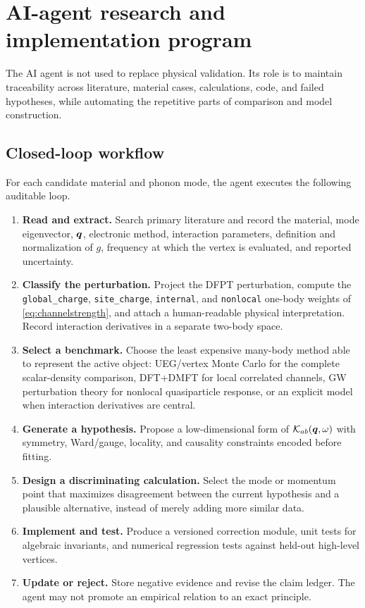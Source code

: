 \section{AI-agent research and implementation program}
\label{sec:program}

The AI agent is not used to replace physical validation.  Its role is to maintain
traceability across literature, material cases, calculations, code, and failed
hypotheses, while automating the repetitive parts of comparison and model
construction.

\subsection{Closed-loop workflow}

For each candidate material and phonon mode, the agent executes the following
auditable loop.

\begin{enumerate}
  \item \textbf{Read and extract.}  Search primary literature and record the
  material, mode eigenvector, $\bm{q}$, electronic method, interaction parameters,
  definition and normalization of $g$, frequency at which the vertex is evaluated,
  and reported uncertainty.
  \item \textbf{Classify the perturbation.}  Project the DFPT perturbation,
  compute the \texttt{global\_charge}, \texttt{site\_charge},
  \texttt{internal}, and \texttt{nonlocal} one-body weights of
  \cref{eq:channelstrength}, and attach a human-readable physical interpretation.
  Record interaction derivatives in a separate two-body space.
  \item \textbf{Select a benchmark.}  Choose the least expensive many-body method
  able to represent the active object: UEG/vertex Monte Carlo for the complete
  scalar-density comparison,
  DFT+DMFT for local correlated channels, GW perturbation theory for nonlocal
  quasiparticle response, or an explicit model when interaction derivatives are
  central.
  \item \textbf{Generate a hypothesis.}  Propose a low-dimensional form of
  $\mathcal K_{ab}(\bm{q},\omega)$ with symmetry, Ward/gauge, locality, and causality
  constraints encoded before fitting.
  \item \textbf{Design a discriminating calculation.}  Select the mode or
  momentum point that maximizes disagreement between the current hypothesis and a
  plausible alternative, instead of merely adding more similar data.
  \item \textbf{Implement and test.}  Produce a versioned correction module,
  unit tests for algebraic invariants, and numerical regression tests against
  held-out high-level vertices.
  \item \textbf{Update or reject.}  Store negative evidence and revise the claim
  ledger.  The agent may not promote an empirical relation to an exact principle.
\end{enumerate}

